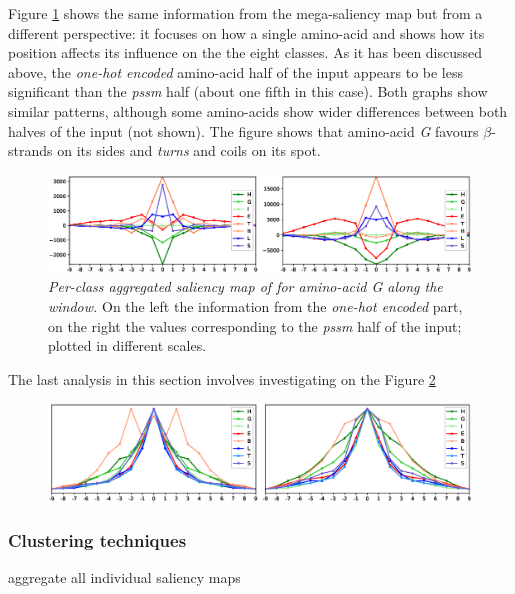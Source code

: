 		Figure \ref{fig:class_agg_aa} shows the same information from the mega-saliency map but from a different perspective: it focuses on how a single amino-acid and shows how its position affects its influence on the the eight classes. As it has been discussed above, the \textit{one-hot encoded} amino-acid half of the input appears to be less significant than the \textit{pssm} half (about one fifth in this case). Both graphs show similar patterns, although some amino-acids show wider differences between both halves of the input (not shown). The figure shows that amino-acid \textit{G} favours $\beta$-strands on its sides and \textit{turns} and coils on its spot. 
		
		\begin{figure}
			\centering
			\includegraphics[width=1\linewidth]{Figures/class_agg_aa}
			\caption{\textit{Per-class aggregated saliency map of for amino-acid G along the window.} On the left the information from the \textit{one-hot encoded} part, on the right the values corresponding to the \textit{pssm} half of the input; plotted in different scales.}
			\label{fig:class_agg_aa}
		\end{figure}
		
		The last analysis in this section involves investigating on the 
		Figure \ref{fig:sheer_class_aa}

		\begin{figure}
			\centering
			\includegraphics[width=1\linewidth]{Figures/sheer_class_aa}
			\caption{}
			\label{fig:sheer_class_aa}
		\end{figure}


	
		\subsubsection*{Clustering techniques}
		aggregate all individual saliency maps %
		
